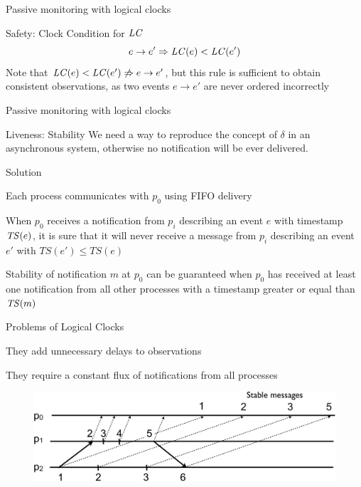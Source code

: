 \begin{frame}{Passive monitoring with logical clocks}

\begin{block}{Safety: Clock Condition for $\mathit{LC}$} 
\[
e \rightarrow e' \Rightarrow \mathit{LC}(e) < \mathit{LC}(e')
\] 
Note that $\mathit{LC}(e) < \mathit{LC}(e') \not\Rightarrow e \rightarrow e'$, but 
this rule is sufficient to obtain consistent observations, as
two events $e \rightarrow e'$ are never ordered incorrectly
\end{block}

\end{frame}

\begin{frame}{Passive monitoring with logical clocks}

\begin{block}{Liveness: Stability} We need a way to reproduce the concept
	of $\delta$ in an asynchronous system, otherwise no notification 
	will be ever delivered.
\end{block}

\begin{block}{Solution}
\BIL
\item Each process communicates with $p_0$ using FIFO delivery
\item When $p_0$ receives a notification from $p_i$ describing an event $e$ 
with timestamp $\mathit{TS}(e)$, it is sure that it will never receive a message
from $p_i$ describing an event $e'$ with $TS(e') \leq TS(e)$
\item Stability of notification $m$ at $p_0$ can be guaranteed when $p_0$ has
received at least one notification from all other processes with a timestamp
greater or equal than $\mathit{TS}(m)$
\EIL
\end{block}

\end{frame}

\begin{frame}{Problems of Logical Clocks}
\BI
\item They add unnecessary delays to observations
\item They require a constant flux of notifications from all processes
\EI

\begin{figure}
	\includegraphics[width=12cm]{figs/03/figura.pdf}
\end{figure}

\end{frame}

